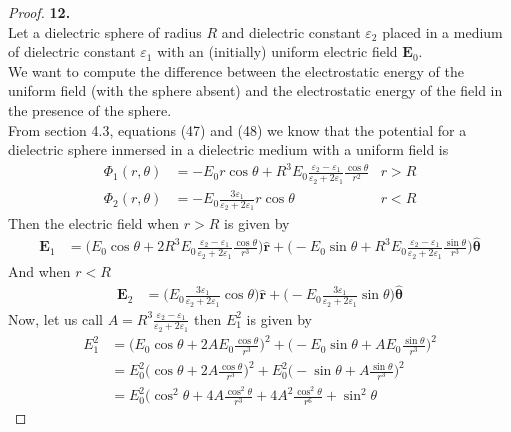 \documentclass[11pt]{article}
\newcommand{\hatr}{\bm{\hat{r}}}
\newcommand{\hattheta}{\bm{\hat{\theta}}}
\theoremstyle{definition}
\begin{document}
\cleardoublepage
\begin{proof}{\textbf{12.}}\\
Let a dielectric sphere of radius $R$ and dielectric constant $\varepsilon_2$
placed in a medium of dielectric constant $\varepsilon_1$ with an (initially)
uniform electric field $\bm{E}_0$.
\\
We want to compute the difference between the electrostatic energy of the
uniform field (with the sphere absent) and the electrostatic energy of the
field in the presence of the sphere.
\\
From section 4.3, equations (47) and (48) we know that the potential for a
dielectric sphere inmersed in a dielectric medium with a uniform field is
\begin{align*}
    \Phi_1(r,\theta)
    &= -E_0r\cos\theta
    + R^3E_0\frac{\varepsilon_2 - \varepsilon_1}{\varepsilon_2 + 2\varepsilon_1}
    \frac{\cos\theta}{r^2} &r > R\\
    \Phi_2(r,\theta)
    &= -E_0\frac{3\varepsilon_1}{\varepsilon_2 + 2\varepsilon_1}
    r\cos\theta &r < R
\end{align*}
Then the electric field when $r > R$ is given by
\begin{align*}
    \bm{E}_1
    &= \bigg(E_0\cos\theta
    + 2R^3E_0\frac{\varepsilon_2 - \varepsilon_1}{\varepsilon_2 + 2\varepsilon_1}
    \frac{\cos\theta}{r^3}\bigg)\hatr
    + \bigg(-E_0\sin\theta
    + R^3E_0\frac{\varepsilon_2 - \varepsilon_1}{\varepsilon_2 + 2\varepsilon_1}
    \frac{\sin\theta}{r^3}\bigg)\hattheta
\end{align*}
And when $r < R$
\begin{align*}
    \bm{E}_2
    &= \bigg(E_0\frac{3\varepsilon_1}{\varepsilon_2 + 2\varepsilon_1}
    \cos\theta\bigg)\hatr 
    + \bigg(- E_0\frac{3\varepsilon_1}{\varepsilon_2 + 2\varepsilon_1}
    \sin\theta\bigg)\hattheta
\end{align*}
Now, let us call $A = R^3\frac{\varepsilon_2 - \varepsilon_1}{\varepsilon_2 + 2\varepsilon_1}$
then $E_1^2$ is given by
\begin{align*}
    E_1^2 &= \bigg(E_0\cos\theta
    + 2AE_0\frac{\cos\theta}{r^3}\bigg)^2
    + \bigg(-E_0\sin\theta
    + AE_0\frac{\sin\theta}{r^3}\bigg)^2\\
    &= E_0^2\bigg(\cos\theta
    + 2A\frac{\cos\theta}{r^3}\bigg)^2
    + E_0^2\bigg(-\sin\theta
    + A\frac{\sin\theta}{r^3}\bigg)^2\\
    &= E_0^2\bigg(\cos^2\theta
    + 4A\frac{\cos^2\theta}{r^3} + 4A^2\frac{\cos^2\theta}{r^6}
    + \sin^2\theta

\end{align*}
\end{proof}
\end{document}
